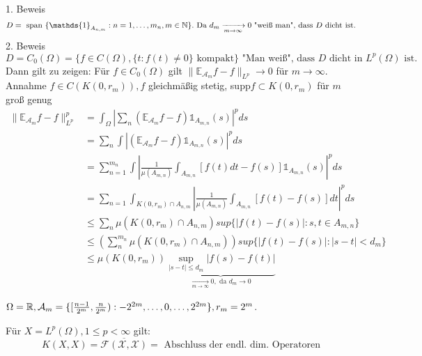 \begin{beweis}
	1. Beweis
	\[ D = \text{ span }\{ \mathds{1}_{A_{n, m}} : n = 1, \dotsc, m_{n}, m \in \MdN \}. \text{ Da } d_{m} \xrightarrow[m \rightarrow \infty]{} 0 \text{ "wei{\ss} man", dass } D \text{ dicht ist.} \]
	2. Beweis
	\[ D = C_{0}(\Omega) = \{ f \in C(\Omega), \{ t: f(t) \neq 0 \} \text{ kompakt} \} \text{ "Man wei{\ss}", dass } D \text{ dicht in } L^{p}(\Omega) \text{ ist.} \]
	Dann gilt zu zeigen: Für $f \in C_{0}(\Omega)$ gilt $\| \mathds{E}_{\mathcal{A}_{m}} f - f \|_{L^{p}} \rightarrow 0$ für $m \rightarrow \infty$. \\
		Annahme $f \in C(K(0, r_{m})), f$ gleichmä{\ss}ig stetig, supp$f \subset K(0, r_{m})$ für $m$ gro{\ss} genug
	\begin{align*}
		\| \mathds{E}_{\mathcal{A}_{m}} f - f \|_{L^{p}}^{p} & =  \int_{\Omega} | \sum_{n} \left( \mathds{E}_{\mathcal{A}_{m}} f - f \right) \mathds{1}_{A_{m, n}}(s) |^{p} ds \\
		& = \sum_{n} \int \left| \left( \mathds{E}_{\mathcal{A}_{m}} f - f \right) \mathds{1}_{A_{m, n}}(s) \right|^{p} ds	 \\
		& = \sum_{n = 1}^{m_{n}} \int \left| \frac{1}{\mu(A_{m, n})} \int_{A_{m,n }} \left[ f(t) dt - f(s) \right] \mathds{1}_{A_{m, n}}(s) \right|^{p} ds \\
		& = \sum_{n = 1} \int_{K(0, r_{m}) \cap A_{n, m}} \left| \frac{1}{\mu(A_{m, n})} \int_{A_{m,n }} \left[ f(t) - f(s) \right] dt \right|^{p} ds \\
		& \leq \sum_{n} \mu\left( K(0, r_{m}) \cap A_{n, m} \right) sup \{ \left| f(t) - f(s) \right| : s, t \in A_{m, n} \} \\
		& \leq \left( \sum_{n}^{m_{n}} \mu\left( K(0, r_{m}) \cap A_{n, m} \right) \right) sup \{ \left| f(t) - f(s) \right| : | s - t| < d_{m} \} \\
		& \leq \mu\left( K(0, r_{m}) \right) \underbrace{\sup_{|s - t| \leq d_{m}} |f(s) - f(t)|}_{\xrightarrow[m \rightarrow \infty]{} 0, \text{ da } d_{m} \rightarrow 0}
	\end{align*}
\end{beweis}

\begin{beispiel*}
	$ \Omega = \mathbb{R}, \mathcal{A}_{m} = \{ [\frac{n - 1}{2^{m}}, \frac{n}{2^{m}}): -2^{2m}, \dotsc, 0, \dotsc, 2^{2m} \}, r_{m} = 2^{m}$.
\end{beispiel*}

\begin{kor*} 
	Für $X = L^{p}(\Omega), 1 \leq p < \infty$ gilt:
	\[ K(X, X) = \overline{\mathcal{F(X, X)}} = \text{ Abschluss der endl. dim. Operatoren} \]
\end{kor*}

